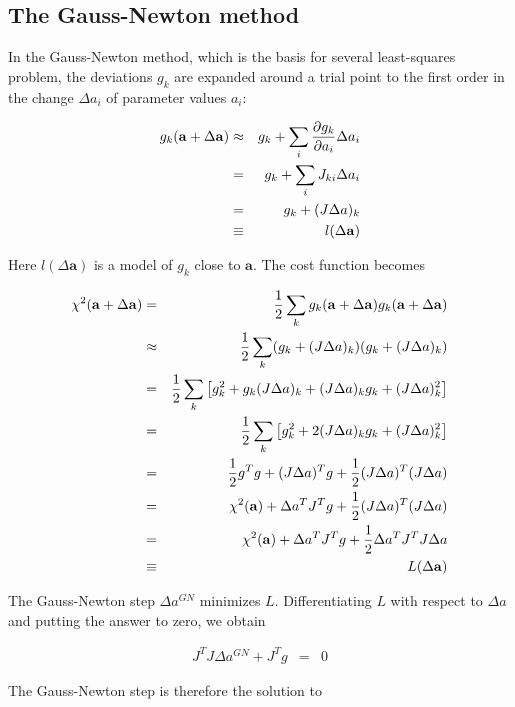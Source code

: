 \documentclass[a4paper,12pt,onecolumn]{article}
\def\a{\mathbf{a}}
\newcommand{\framepar}[1]{
\fbox{
\parbox[t]{0.80\textwidth}{
#1
}}}
\begin{document}
\subsection{The Gauss-Newton method}

In the Gauss-Newton method, which is the basis for several
least-squares problem, the deviations $g_k$ are expanded
around a trial point to the first order in the change $\Delta a_i$ of
parameter values $a_i$:

\begin{eqnarray}
g_k(\a + \Delta \a)
&\approx & g_k + \sum_i {\partial g_k \over \partial a_i} \Delta a_i \\
&=& g_k + \sum_i J_{ki} \Delta a_i \\
&=& g_k + (J \Delta a)_k \\
&\equiv & l(\Delta \a)
\end{eqnarray}

Here $l(\Delta \a)$ is a model of $g_k$ close to $\a$.
The cost function becomes

\begin{eqnarray}
\chi^2(\a + \Delta \a)
&=& {1 \over 2} \sum_k g_k(\a + \Delta \a) g_k(\a + \Delta \a) \\
&\approx & {1 \over 2} \sum_k (g_k + (J \Delta a)_k) (g_k + (J \Delta a)_k) \\
&=& {1 \over 2} \sum_k \left[
g_k^2 + g_k (J \Delta a)_k + (J \Delta a)_k g_k + (J \Delta a)_k^2
\right] \\
&=& {1 \over 2} \sum_k \left[ g_k^2
+ 2 (J \Delta a)_k g_k + (J \Delta a)_k^2 \right] \\
&=& {1 \over 2} g^T g 
+ (J \Delta a)^T g
+ {1 \over 2} (J \Delta a)^T (J \Delta a) \\
&=& \chi^2(\a)
+ \Delta a^T J^T g
+ {1 \over 2} (J \Delta a)^T (J \Delta a) \\
&=& \chi^2(\a)
+ \Delta a^T J^T g
+ {1 \over 2} \Delta a^T J^T J \Delta a \\
&\equiv & L(\Delta \a)
\end{eqnarray}

The Gauss-Newton step $\Delta a^{GN}$ minimizes $L$. Differentiating
$L$ with respect to $\Delta a$ and putting the answer to zero, we obtain

\begin{eqnarray}
J^T J \Delta a^{GN} + J^T g &=& 0
\end{eqnarray}

The Gauss-Newton step is therefore the solution to

\framepar{
\begin{eqnarray}
J^T J \Delta a^{GN} &=& - J^T g
\end{eqnarray}
}
\end{document}
